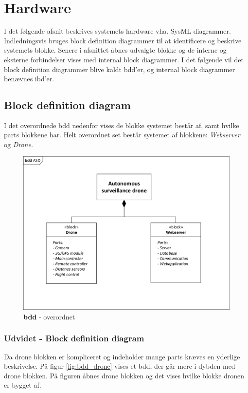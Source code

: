 \chapter{Hardware}

I det følgende afsnit beskrives systemets hardware vha. SysML diagrammer. 
Indledningsvis bruges block definition diagrammer til at identificere og beskrive systemets blokke. Senere i afsnittet åbnes udvalgte blokke og de interne og eksterne forbindelser vises med internal block diagrammer. 
I det følgende vil det block definition diagrammer blive kaldt bdd'er, og internal block diagrammer benævnes ibd'er. 

\section{Block definition diagram}
I det overordnede bdd nedenfor vises de blokke systemet består af, samt hvilke parts blokkene har. Helt overordnet set består systemet af blokkene: \textit{Webserver} og \textit{Drone}. 

\begin{figure}[H]
\centering
\includegraphics[width=1\textwidth]{Billeder/BDD/bdd_overordnet.pdf}
\vspace{-0.5cm}
\caption{\textbf{bdd} - overordnet}
\label{fig:bdd_overordnet}
\end{figure}

\newpage
\subsection{Udvidet - Block definition diagram}
Da drone blokken er kompliceret og indeholder mange parts kræves en yderlige beskrivelse. På figur \ref{fig:bdd_drone} vises et bdd, der går mere i dybden med drone blokken. På figuren åbnes drone blokken og det vises hvilke blokke dronen er bygget af. 

